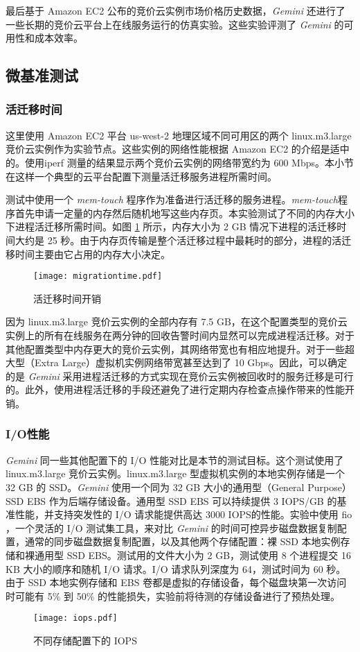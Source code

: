 最后基于 Amazon EC2 公布的竞价云实例市场价格历史数据，\emph{Gemini} 还进行了一些长期的竞价云平台上在线服务运行的仿真实验。这些实验评测了 \emph{Gemini} 的可用性和成本效率。

\subsection{微基准测试}

\subsubsection{活迁移时间}
\label{gemini-migrationtime}
这里使用 Amazon EC2 平台 us-west-2 地理区域不同可用区的两个 linux.m3.large 竞价云实例作为实验节点。这些实例的网络性能根据 Amazon EC2 的介绍是适中的。使用iperf \cite{Iperf:2014} 测量的结果显示两个竞价云实例的网络带宽约为 600 Mbps。本小节在这样一个典型的云平台配置下测量活迁移服务进程所需时间。

测试中使用一个 \emph{mem-touch} 程序作为准备进行活迁移的服务进程。\emph{mem-touch}程序首先申请一定量的内存然后随机地写这些内存页。本实验测试了不同的内存大小下进程活迁移所需时间。如图 \ref{figure:migrationtime} 所示，内存大小为 2 GB 情况下进程的活迁移时间大约是 25 秒。由于内存页传输是整个活迁移过程中最耗时的部分，进程的活迁移时间主要由它占用的内存大小决定。
\begin{figure}
  \centering
  \texttt{[image: migrationtime.pdf]}
  \caption{活迁移时间开销}
  \label{figure:migrationtime}
\end{figure}

因为 linux.m3.large 竞价云实例的全部内存有 7.5 GB，在这个配置类型的竞价云实例上的所有在线服务在两分钟的回收告警时间内显然可以完成进程活迁移。对于其他配置类型中内存更大的竞价云实例，其网络带宽也有相应地提升。对于一些超大型（Extra Large）虚拟机实例网络带宽甚至达到了 10 Gbps。因此，可以确定的是 \emph{Gemini} 采用进程活迁移的方式实现在竞价云实例被回收时的服务迁移是可行的。此外，使用进程活迁移的手段还避免了进行定期内存检查点操作带来的性能开销。

\subsubsection{I/O性能}
\emph{Gemini} 同一些其他配置下的 I/O 性能对比是本节的测试目标。这个测试使用了 linux.m3.large 竞价云实例。linux.m3.large 型虚拟机实例的本地实例存储是一个 32 GB 的 SSD。\emph{Gemini} 使用一个同为 32 GB 大小的通用型（General Purpose）SSD EBS 作为后端存储设备。通用型 SSD EBS 可以持续提供 3 IOPS/GB 的基准性能，并支持突发性的 I/O 请求能提供高达 3000 IOPS的性能。实验中使用 fio \cite{FIO:2014}，一个灵活的 I/O 测试集工具，来对比 \emph{Gemini} 的时间可控异步磁盘数据复制配置，通常的同步磁盘数据复制配置，以及其他两个存储配置：裸 SSD 本地实例存储和裸通用型 SSD EBS。测试用的文件大小为 2 GB，测试使用 8 个进程提交 16 KB 大小的顺序和随机 I/O 请求。I/O 请求队列深度为 64，测试时间为 60 秒。由于 SSD 本地实例存储和 EBS 卷都是虚拟的存储设备，每个磁盘块第一次访问时可能有 5\% 到 50\% 的性能损失，实验前将待测的存储设备进行了预热处理。
\begin{figure}[]
  \centering
  \texttt{[image: iops.pdf]}
  \caption{不同存储配置下的 IOPS}
  \label{figure:iops}
\end{figure}

